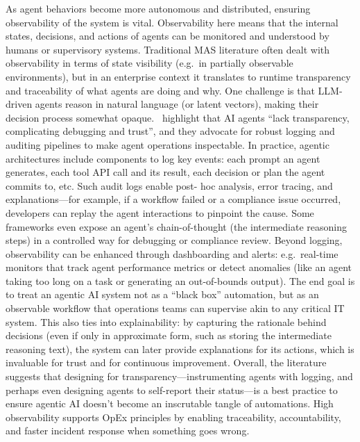 As agent behaviors become more autonomous and distributed, ensuring observability of the system is vital. Observability here means that the internal states, decisions, and actions of agents can be monitored and understood by humans or supervisory systems. Traditional MAS literature often dealt with observability in terms of state visibility (e.g.~in partially observable environments), but in an enterprise context it translates to runtime transparency and traceability of what agents are doing and why. One challenge is that LLM-driven agents reason in natural language (or latent vectors), making their decision process somewhat opaque.~\textcite{sapkotaAI2026} highlight that AI agents “lack transparency, complicating debugging and trust”, and they advocate for robust logging and auditing pipelines to make agent operations inspectable. In practice, agentic architectures include components to log key events: each prompt an agent generates, each tool API call and its result, each decision or plan the agent commits to, etc. Such audit logs enable post- hoc analysis, error tracing, and explanations—for example, if a workflow failed or a compliance issue occurred, developers can replay the agent interactions to pinpoint the cause. Some frameworks even expose an agent's chain-of-thought (the intermediate reasoning steps) in a controlled way for debugging or compliance review. Beyond logging, observability can be enhanced through dashboarding and alerts: e.g.~real-time monitors that track agent performance metrics or detect anomalies (like an agent taking too long on a task or generating an out-of-bounds output). The end goal is to treat an agentic AI system not as a “black box” automation, but as an observable workflow that operations teams can supervise akin to any critical IT system. This also ties into explainability: by capturing the rationale behind decisions (even if only in approximate form, such as storing the intermediate reasoning text), the system can later provide explanations for its actions, which is invaluable for trust and for continuous improvement. Overall, the literature suggests that designing for transparency—instrumenting agents with logging, and perhaps even designing agents to self-report their status—is a best practice to ensure agentic AI doesn't become an inscrutable tangle of automations. High observability supports OpEx principles by enabling traceability, accountability, and faster incident response when something goes wrong.

